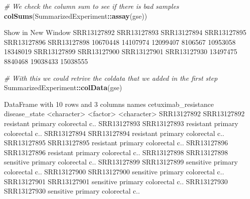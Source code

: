 \documentclass[
]{article}
\newenvironment{Shaded}{\begin{snugshade}}{\end{snugshade}}
\newcommand{\CommentTok}[1]{\textcolor[rgb]{0.56,0.35,0.01}{\textit{#1}}}
\newcommand{\FunctionTok}[1]{\textcolor[rgb]{0.13,0.29,0.53}{\textbf{#1}}}
\newcommand{\NormalTok}[1]{#1}
\newcommand{\SpecialCharTok}[1]{\textcolor[rgb]{0.81,0.36,0.00}{\textbf{#1}}}
\begin{document}
\begin{Shaded}
\begin{Highlighting}[]
\CommentTok{\# We check the column sum to see if there is bad samples}
\FunctionTok{colSums}\NormalTok{(SummarizedExperiment}\SpecialCharTok{::}\FunctionTok{assay}\NormalTok{(gse))}
\end{Highlighting}
\end{Shaded}

\begin{Shaded}
\begin{Highlighting}[]
\NormalTok{Show in New Window}
\NormalTok{SRR13127892 SRR13127893 SRR13127894 SRR13127895 SRR13127896 SRR13127898 }
\NormalTok{   10670448    14107974    12099407     8106567    10953058    18348019 }
\NormalTok{SRR13127899 SRR13127900 SRR13127901 SRR13127930 }
\NormalTok{   13497475     8840468    19038433    15038555 }
\end{Highlighting}
\end{Shaded}

\begin{Shaded}
\begin{Highlighting}[]
\CommentTok{\# With this we could retrive the coldata that we added in the first step}
\NormalTok{SummarizedExperiment}\SpecialCharTok{::}\FunctionTok{colData}\NormalTok{(gse)}
\end{Highlighting}
\end{Shaded}

\begin{Shaded}
\begin{Highlighting}[]
\NormalTok{DataFrame with 10 rows and 3 columns}
\NormalTok{                  names cetuximab\_resistance          disease\_state}
\NormalTok{            \textless{}character\textgreater{}             \textless{}factor\textgreater{}            \textless{}character\textgreater{}}
\NormalTok{SRR13127892 SRR13127892            resistant primary colorectal c..}
\NormalTok{SRR13127893 SRR13127893            resistant primary colorectal c..}
\NormalTok{SRR13127894 SRR13127894            resistant primary colorectal c..}
\NormalTok{SRR13127895 SRR13127895            resistant primary colorectal c..}
\NormalTok{SRR13127896 SRR13127896            resistant primary colorectal c..}
\NormalTok{SRR13127898 SRR13127898            sensitive primary colorectal c..}
\NormalTok{SRR13127899 SRR13127899            sensitive primary colorectal c..}
\NormalTok{SRR13127900 SRR13127900            sensitive primary colorectal c..}
\NormalTok{SRR13127901 SRR13127901            sensitive primary colorectal c..}
\NormalTok{SRR13127930 SRR13127930            sensitive primary colorectal c..}
\end{Highlighting}
\end{Shaded}
\end{document}
